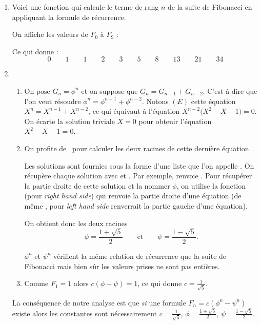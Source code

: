 \documentclass[class=report,crop=false]{standalone}
\begin{document}
\begin{enumerate}
  \item 


Voici une fonction qui calcule le terme de rang $n$ de la suite de Fibonacci
en appliquant la formule de récurrence.


On affiche les valeurs de $F_0$ à $F_9$ :


Ce qui donne :
$$0 \qquad 1 \qquad 1 \qquad 2 \qquad 3 \qquad 5 \qquad 8 \qquad 13 \qquad 21 
\qquad 34 $$

  \item 
  \begin{enumerate}
    \item On pose $G_n = \phi^n$ et on suppose que $G_{n} = G_{n-1}+G_{n-2}$.
  C'est-à-dire que l'on veut résoudre $\phi^n = \phi^{n-1} + \phi^{n-2}$.
  Notons $(E)$ cette équation $X^n = X^{n-1} + X^{n-2}$,
  ce qui équivaut à l'équation $X^{n-2}\big(X^2-X-1 \big) = 0$.
  On écarte la solution triviale $X=0$ pour obtenir l'équation 
  $X^2-X-1 = 0$.  
  
  
    \item On profite de \Sage\ pour calculer les deux racines de cette dernière
  équation.
  
  Les solutions sont fournies sous la forme d'une liste que l'on appelle
  . On récupère chaque solution
  avec  et .
  Par exemple,  renvoie .
  Pour récupérer la partie droite de cette solution et la nommer $\phi$, 
  on utilise la fonction  (pour \emph{right hand side})
  qui renvoie la partie droite d'une équation (de même , 
  pour \emph{left hand side} renverrait la partie gauche d'une équation).
  
  On obtient donc les deux racines
  $$\phi = \frac{1+\sqrt5}{2} \qquad \mbox{et} \qquad \psi  = \frac{1-\sqrt5}{2}.$$
  
  $\phi^n$ et $\psi^n$ vérifient la même relation de récurrence que la suite de Fibonacci
  mais bien sûr les valeurs prises ne sont pas entières.
  
    \item Comme $F_1=1$ alors $c(\phi-\psi)=1$, ce qui donne $c = \frac{1}{\sqrt 5}$.
  \end{enumerate}  
  La conséquence de notre analyse est que \emph{si} une formule 
  $F_n = c(\phi^n-\psi^n)$ existe alors les constantes sont
  nécessairement $c= \frac{1}{\sqrt 5}$, $\phi = \frac{1+\sqrt5}{2}$, 
  $\psi  = \frac{1-\sqrt5}{2}$.
  


\end{enumerate}
\end{document}
